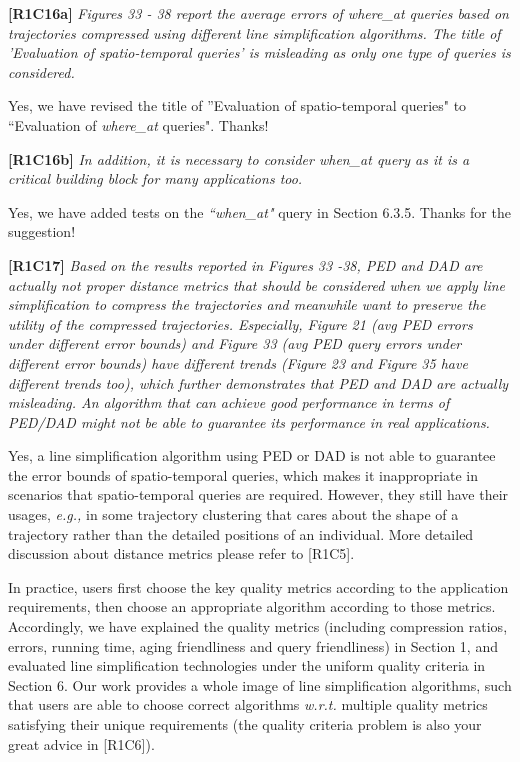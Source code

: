\documentclass{letter}
\newcommand{\eg}{\emph{e.g.,}\xspace}
\newcommand{\wrt}{\emph{w.r.t.}\xspace}
\begin{document}
\textbf{[R1C16a]} \emph{ Figures 33 - 38 report the average errors of where\_at queries based on trajectories compressed using different line simplification algorithms. The title of 'Evaluation of spatio-temporal queries' is misleading as only one type of queries is considered.}

Yes, we have revised the title of ''Evaluation of spatio-temporal queries" to ``Evaluation of \emph{where\_at} queries". Thanks!

\textbf{[R1C16b]} \emph{In addition, it is necessary to consider \emph{when\_at} query as it is a critical building block for many applications too.}

Yes, we have added tests on the \emph{``when\_at"} query in Section 6.3.5. Thanks for the suggestion!

\textbf{[R1C17]} \emph{ Based on the results reported in Figures 33 -38, PED and DAD are actually not proper distance metrics that should be considered when we apply line simplification to compress the trajectories and meanwhile want to preserve the utility of the compressed trajectories. Especially, Figure 21 (avg PED errors under different error bounds) and Figure 33 (avg PED query errors under different error bounds) have different trends (Figure 23 and Figure 35 have different trends too), which further demonstrates that PED and DAD are actually misleading. An algorithm that can achieve good performance in terms of PED/DAD might not be able to guarantee its performance in real applications. }

Yes, a line simplification algorithm using PED or DAD is not able to guarantee the error bounds of spatio-temporal queries, which makes it inappropriate in scenarios that spatio-temporal queries are required. However, they still have their usages, \eg in some trajectory clustering that cares about the shape of a trajectory rather than the detailed positions of an individual. More detailed discussion about distance metrics please refer to [R1C5].

In practice, users first choose the key quality metrics according to the application requirements, then choose an appropriate algorithm according to those metrics.
Accordingly, we have explained the quality metrics (including compression ratios, errors, running time, aging friendliness and query friendliness) in Section 1, and evaluated line simplification technologies under the uniform quality criteria in Section 6. Our work provides a whole image of line simplification algorithms, such that {users are able to choose correct algorithms} \wrt multiple quality metrics satisfying their unique requirements (the quality criteria problem is also your great advice in [R1C6]).
\end{document}
